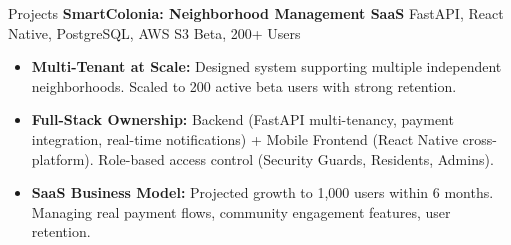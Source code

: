 \documentclass{resume}
\begin{document}
\begin{rSection}{Projects}
\textbf{SmartColonia: Neighborhood Management SaaS} {FastAPI, React Native, PostgreSQL, AWS S3} \hfill {Beta, 200+ Users}
\begin{itemize}
    \item \textbf{Multi-Tenant at Scale:} Designed system supporting multiple independent neighborhoods. Scaled to 200 active beta users with strong retention.
    \item \textbf{Full-Stack Ownership:} Backend (FastAPI multi-tenancy, payment integration, real-time notifications) + Mobile Frontend (React Native cross-platform). Role-based access control (Security Guards, Residents, Admins).
    \item \textbf{SaaS Business Model:} Projected growth to 1,000 users within 6 months. Managing real payment flows, community engagement features, user retention.
\end{itemize}

\end{rSection}
\end{document}
